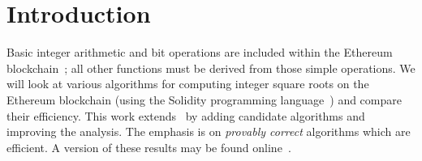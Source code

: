 \section{Introduction}

Basic integer arithmetic and bit operations are included
within the Ethereum blockchain~\cite{EthereumYellowpaper};
all other functions must be derived from those simple operations.
We will look at various algorithms for computing integer square roots
on the Ethereum blockchain
(using the Solidity programming language~\cite{SolidityLanguage})
and compare their efficiency.
This work extends~\cite{EfficientIsqrt}
by adding candidate algorithms and improving the analysis.
The emphasis is on \emph{provably correct} algorithms which are efficient.
A version of these results may be found online~\cite{IsqrtRepo}.
